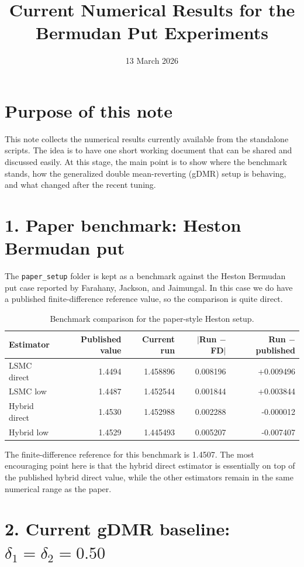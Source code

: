 \documentclass[11pt]{article}
\title{Current Numerical Results for the Bermudan Put Experiments}
\date{13 March 2026}
\begin{document}
\maketitle

\section*{Purpose of this note}

This note collects the numerical results currently available from the standalone scripts.
The idea is to have one short working document that can be shared and discussed easily.
At this stage, the main point is to show where the benchmark stands, how the generalized
double mean-reverting (gDMR) setup is behaving, and what changed after the recent tuning.

\section*{1. Paper benchmark: Heston Bermudan put}

The \texttt{paper\_setup} folder is kept as a benchmark against the Heston Bermudan put case
reported by Farahany, Jackson, and Jaimungal. In this case we do have a published finite-difference
reference value, so the comparison is quite direct.

\begin{table}[h]
\centering
\caption{Benchmark comparison for the paper-style Heston setup.}
\begin{tabular}{lrrrr}
\toprule
Estimator & Published value & Current run & $|$Run $-$ FD$|$ & Run $-$ published \\
\midrule
LSMC direct   & 1.4494 & 1.458896 & 0.008196 & +0.009496 \\
LSMC low      & 1.4487 & 1.452544 & 0.001844 & +0.003844 \\
Hybrid direct & 1.4530 & 1.452988 & 0.002288 & -0.000012 \\
Hybrid low    & 1.4529 & 1.445493 & 0.005207 & -0.007407 \\
\bottomrule
\end{tabular}
\end{table}

The finite-difference reference for this benchmark is 1.4507. The most encouraging point here is
that the hybrid direct estimator is essentially on top of the published hybrid direct value, while
the other estimators remain in the same numerical range as the paper.

\section*{2. Current gDMR baseline: $\delta_1=\delta_2=0.50$}
\end{document}

